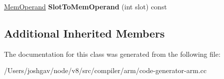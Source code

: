 \begin{DoxyCompactItemize}
\item 
\hyperlink{classv8_1_1internal_1_1_mem_operand}{Mem\+Operand} {\bfseries Slot\+To\+Mem\+Operand} (int slot) const \hypertarget{classv8_1_1internal_1_1compiler_1_1_arm_operand_converter_a77522938ef2c637f6fb6d78713215491}{}\label{classv8_1_1internal_1_1compiler_1_1_arm_operand_converter_a77522938ef2c637f6fb6d78713215491}

\end{DoxyCompactItemize}
\subsection*{Additional Inherited Members}


The documentation for this class was generated from the following file\+:\begin{DoxyCompactItemize}
\item 
/\+Users/joshgav/node/v8/src/compiler/arm/code-\/generator-\/arm.\+cc\end{DoxyCompactItemize}
